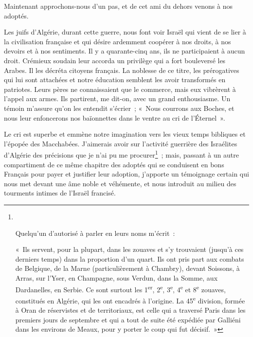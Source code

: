 \documentclass[french,twoside]{book} %
\begin{document}
Maintenant approchons-nous d’un pas, et de cet ami du dehors venons à nos adoptés.‌\par
Les juifs d’Algérie, durant cette guerre, nous font voir Israël qui vient de se lier à la civilisation française et qui désire ardemment coopérer à nos droits, à nos devoirs et à nos sentiments. Il y a quarante-cinq ans, ils ne participaient à aucun droit. Crémieux soudain leur accorda un privilège qui a fort bouleversé les Arabes. Il les décréta citoyens français. La noblesse de ce titre, les prérogatives qui lui sont attachées et notre éducation semblent les avoir transformés en patriotes. Leurs pères ne connaissaient que le commerce, mais eux vibrèrent à l’appel aux armes. Ils partirent, me dit-on, avec un grand enthousiasme. Un témoin m’assure qu’on les entendit s’écrier ; « Nous courrons aux Boches, et nous leur enfoncerons nos baïonnettes dans le ventre au cri de l’Éternel ».‌\par
Le cri est superbe et emmène notre imagination vers les vieux temps bibliques et l’épopée des Macchabées. J’aimerais avoir sur l’activité guerrière des Israélites d’Algérie des précisions que je n’ai pu me procurer\footnote{ ‌\par
 Quelqu’un d’autorisé à parler en leurs noms m’écrit :‌\par
 \noindent « Ils servent, pour la plupart, dans les zouaves et s’y trouvaient (jusqu’à ces derniers temps) dans la proportion d’un quart. Ils ont pris part aux combats de Belgique, de la Marne (particulièrement à Chambry), devant Soissons, à Arras, sur l’Yser, en Champagne, sous Verdun, dans la Somme, aux Dardanelles, en Serbie. Ce sont surtout les 1\textsuperscript{er}, 2\textsuperscript{e}, 3\textsuperscript{e}, 4\textsuperscript{e} et 8\textsuperscript{e} zouaves, constitués en Algérie, qui les ont encadrés à l’origine. La 45\textsuperscript{e} division, formée à Oran de réservistes et de territoriaux, est celle qui a traversé Paris dans les premiers jours de septembre et qui a tout de suite été expédiée par Galliéni dans les environs de Meaux, pour y porter le coup qui fut décisif. »
 } ; mais, passant à un autre compartiment de ce même chapitre des adoptés qui se conduisent en bons Français pour payer et justifier leur adoption, j’apporte un témoignage certain qui nous met devant une âme noble et véhémente, et nous introduit au milieu des tourments intimes de l’Israël francisé.‌\par
\end{document}
